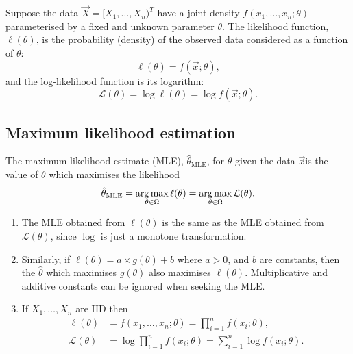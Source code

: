 \documentclass[10pt, a4paper]{article}
\begin{document}
\begin{definition}
    Suppose the data $\vec{X} = [X_1, \dotsc, X_n) ^ T$ have a joint density $f(x_1, \dotsc, x_n; \theta)$ parameterised by a fixed and unknown parameter $\theta$.
    The likelihood function,
    $\ell(\theta)$,
    is the probability
    (density)
    of the observed data considered as a function of $\theta$:
    \[
    \ell(\theta) = f(\vec{x}; \theta),
    \]
    and the log-likelihood function is its logarithm:
    \[
    \mathcal{L}(\theta) = \log{\ell(\theta)} = \log{f(\vec{x}; \theta)}.
    \]
\end{definition}

\subsection{Maximum likelihood estimation}
\begin{definition}
    The maximum likelihood estimate
    (MLE),
    $\hat{\theta}_{\text{MLE}}$,
    for $\theta$ given the data $\vec{x}$is the value of $\theta$ which maximises the likelihood
    \[
    \hat{\theta}_{\text{MLE}} = \operatorname*{arg\,max}_{\theta \in \Omega}{\ell(\theta)} = \operatorname*{arg\,max}_{\theta \in \Omega}\mathcal{L}(\theta).
    \]
\end{definition}

\begin{proposition}
    \begin{enumerate}[label = \arabic*.]
        \item The MLE obtained from $\ell(\theta)$ is the same as the MLE obtained from $\mathcal{L}(\theta)$,
        since $\log$ is just a monotone transformation.

        \item Similarly,
        if $\ell(\theta) = a \times g(\theta) + b$ where $a > 0$,
        and $b$ are constants,
        then the $\hat{\theta}$ which maximises $g(\theta)$ also maximises $\ell(\theta)$.
        Multiplicative and additive constants can be ignored when seeking the MLE.

        \item If $X_1, \dotsc, X_n$ are IID then
        \begin{align*}
            \ell(\theta) &= f(x_1, \dotsc, x_n; \theta) = \prod_{i = 1}^{n}f(x_i; \theta), \\
            \mathcal{L}(\theta) &= \log\prod_{i = 1}^{n}f(x_i; \theta) = \sum_{i = 1}^{n}\log f(x_i; \theta).
        \end{align*}
    \end{enumerate}
\end{proposition}
\end{document}

